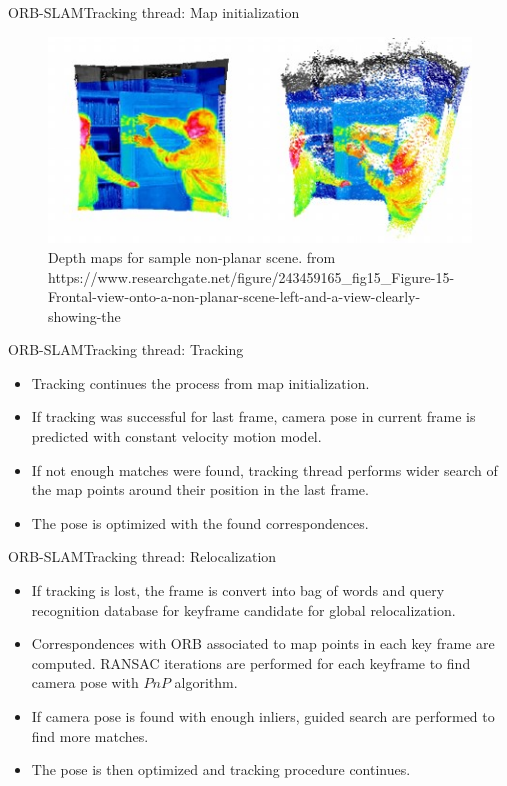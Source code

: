 \documentclass[aspectratio=169]{beamer}
\begin{document}
\begin{frame}{ORB-SLAM}{Tracking thread: Map initialization}
  \begin{figure}
\includegraphics[scale=0.7]{figs/non_planar}
\caption{Depth maps for sample non-planar scene. from
  https://www.researchgate.net/figure/243459165\_fig15\_Figure-15-Frontal-view-onto-a-non-planar-scene-left-and-a-view-clearly-showing-the}
\end{figure}
\end{frame}

\begin{frame}{ORB-SLAM}{Tracking thread: Tracking}
  \begin{itemize}
      \item{
      Tracking continues the process from map initialization.
      }
      \item{
      If tracking was successful for last frame, camera pose in current frame is predicted with constant velocity motion model.
      }
      \item{
      If not enough matches were found, tracking thread performs wider search of the map points around their position in the last frame.
      }
      \item{
      The pose is optimized with the found correspondences.
      }
  \end{itemize}  
\end{frame}

\begin{frame}{ORB-SLAM}{Tracking thread: Relocalization}
    \begin{itemize}
        \item{
        If tracking is lost, the frame is convert into bag of words and query recognition database for keyframe candidate for global relocalization.
        }
        \item{
        Correspondences with ORB associated to map points in each key frame are computed. RANSAC iterations are performed for each keyframe to find camera pose with $PnP$ algorithm.
        }
        \item{
        If camera pose is found with enough inliers, guided search are performed to find more matches.
        }
        \item{
        The pose is then optimized and tracking procedure continues.
        }
    \end{itemize}    
\end{frame}
\end{document}
